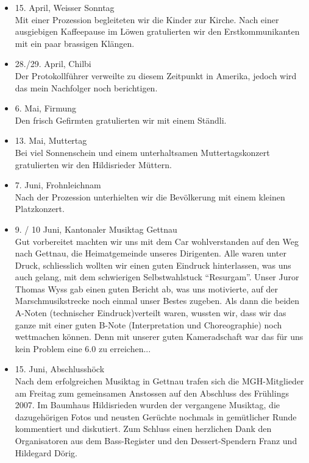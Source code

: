 \begin{history}
\begin{itemize}
        \item 15. April, Weisser Sonntag\\
              Mit einer Prozession begleiteten wir die Kinder zur Kirche. Nach einer
              ausgiebigen Kaffeepause im Löwen gratulierten wir den Erstkommunikanten
              mit ein paar brassigen Klängen.

        \item 28./29. April, Chilbi\\
              Der Protokollführer verweilte zu diesem Zeitpunkt in Amerika, jedoch
              wird das mein Nachfolger noch berichtigen.

        \item 6. Mai, Firmung\\
              Den frisch Gefirmten gratulierten wir mit einem Ständli.

        \item 13. Mai, Muttertag\\
              Bei viel Sonnenschein und einem unterhaltsamen Muttertagskonzert
              gratulierten wir den Hildisrieder Müttern.

        \item 7. Juni, Frohnleichnam\\
              Nach der Prozession unterhielten wir die Bevölkerung mit einem kleinen
              Platzkonzert.

        \item 9. / 10 Juni, Kantonaler Musiktag Gettnau\\
              Gut vorbereitet machten wir uns mit dem Car wohlverstanden auf den Weg
              nach Gettnau, die Heimatgemeinde unseres Dirigenten. Alle waren unter
              Druck, schliesslich wollten wir einen guten Eindruck hinterlassen, was
              uns auch gelang, mit dem schwierigen Selbstwahlstuck \enquote{Resurgam}.
              Unser Juror Thomas Wyss gab einen guten Bericht ab, was uns motivierte,
              auf der Marschmusikstrecke noch einmal unser Bestes zugeben. Als dann
              die beiden A-Noten (technischer Eindruck)verteilt waren, wussten wir,
              dass wir das ganze mit einer guten B-Note (Interpretation und
              Choreographie) noch wettmachen können. Denn mit unserer guten
              Kameradschaft war das für uns kein Problem eine 6.0 zu erreichen...

        \item 15. Juni, Abschlusshöck\\
              Nach dem erfolgreichen Musiktag in Gettnau trafen sich die
              MGH-Mitglieder am Freitag zum gemeinsamen Anstossen auf den Abschluss
              des Frühlings 2007. Im Baumhaus Hildisrieden wurden der vergangene
              Musiktag, die dazugehörigen Fotos und neusten Gerüchte nochmals in
              gemütlicher Runde kommentiert und diskutiert. Zum Schluss einen
              herzlichen Dank den Organisatoren aus dem Bass-Register und den
              Dessert-Spendern Franz und Hildegard Dörig.


\end{itemize}
\end{history}
